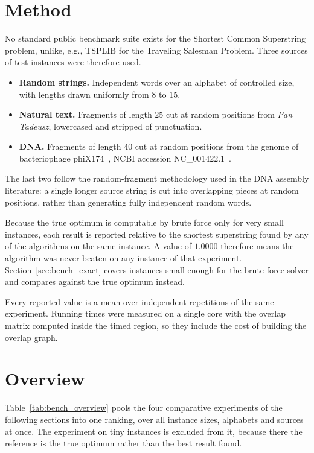 \section{Method}

No standard public benchmark suite exists for the Shortest Common
Superstring problem, unlike, e.g., TSPLIB for the Traveling Salesman
Problem. Three sources of test instances were therefore used.

\begin{itemize}[itemsep=3pt,topsep=4pt]
\item \textbf{Random strings.} Independent words over an alphabet of
      controlled size, with lengths drawn uniformly from $8$ to $15$.
\item \textbf{Natural text.} Fragments of length $25$ cut at random
      positions from \emph{Pan Tadeusz}, lowercased and stripped of
      punctuation.
\item \textbf{DNA.} Fragments of length $40$ cut at random positions from
      the genome of bacteriophage phiX174~\cite{sanger1977phix174}, NCBI
      accession NC\_001422.1~\cite{ncbi_phix174}.
\end{itemize}

The last two follow the random-fragment methodology used in the DNA
assembly literature: a single longer source string is cut into overlapping
pieces at random positions, rather than generating fully independent random
words.

Because the true optimum is computable by brute force only for very small
instances, each result is reported relative to the shortest superstring
found by any of the algorithms on the same instance. A value of $1.0000$
therefore means the algorithm was never beaten on any instance of that
experiment. Section~\ref{sec:bench_exact} covers instances small enough for
the brute-force solver and compares against the true optimum instead.

Every reported value is a mean over independent repetitions of the same
experiment. Running times were measured on a single core with the overlap
matrix computed inside the timed region, so they include the cost of
building the overlap graph.

\section{Overview}

Table~\ref{tab:bench_overview} pools the four comparative experiments of
the following sections into one ranking, over all instance sizes, alphabets
and sources at once. The experiment on tiny instances is excluded from it,
because there the reference is the true optimum rather than the best result
found.

